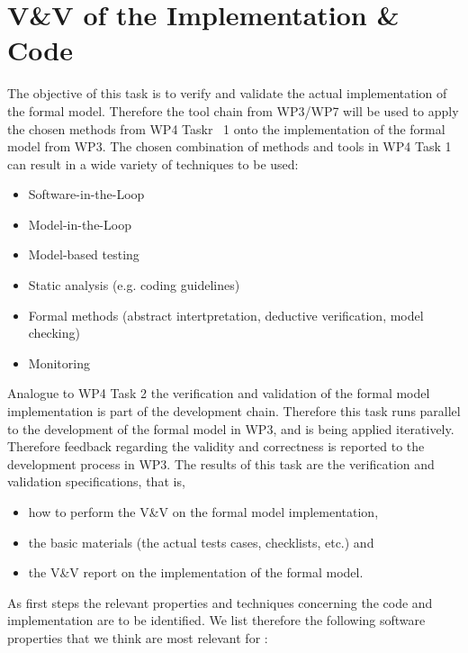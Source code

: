 \section{V\&V of the Implementation \& Code}

The objective of this task is to verify and validate the actual implementation of the formal model.
Therefore the tool chain from WP3\slash WP7 will be used to apply the chosen methods from
WP4 Taskr~ 1 onto the implementation of the formal model from WP3.
The chosen combination of methods and tools in WP4 Task 1 can result
in a wide variety of techniques to be used:

\begin{itemize}
\item Software-in-the-Loop
\item  Model-in-the-Loop
\item  Model-based testing
\item  Static analysis (e.g. coding guidelines)
\item  Formal methods (abstract intertpretation, deductive verification, model checking)
\item  Monitoring
\end{itemize}

Analogue to WP4 Task 2 the verification and validation of the formal model
implementation is part of the development chain.
Therefore this task runs parallel to the development of the formal model in WP3, and is being applied iteratively.
Therefore feedback regarding the validity and correctness is reported to the
development process in WP3.
The results of this task are the verification and validation specifications, that is,

\begin{itemize}
\item 
how to perform the V\&V on the formal model implementation,

\item
the basic materials (the actual tests cases, checklists, etc.) and

\item
the V\&V report on the implementation of the formal model.
\end{itemize}

As first steps the relevant properties and techniques concerning the code and
implementation are to be identified. 
We list therefore the following software properties that we think are most relevant for \vv:

